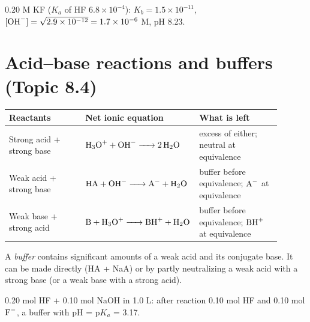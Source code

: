 \documentclass[11pt]{article}
\begin{document}
 0.20 M KF ($K_a$ of HF $6.8\times10^{-4}$): $K_b = 1.5\times10^{-11}$, $[\ce{OH-}] = \sqrt{2.9\times10^{-12}} = 1.7\times10^{-6}$ M, pH 8.23.

\section{Acid--base reactions and buffers (Topic 8.4)}\label{t:8.4}
\begin{center}
\begin{tabular}{p{0.28\linewidth}p{0.32\linewidth}p{0.3\linewidth}}\toprule
Reactants & Net ionic equation & What is left \\ \midrule
Strong acid + strong base & $\ce{H3O+ + OH- -> 2H2O}$ & excess of either; neutral at equivalence \\
Weak acid + strong base & $\ce{HA + OH- -> A- + H2O}$ & buffer before equivalence; $\ce{A-}$ at equivalence \\
Weak base + strong acid & $\ce{B + H3O+ -> BH+ + H2O}$ & buffer before equivalence; $\ce{BH+}$ at equivalence \\ \bottomrule
\end{tabular}
\end{center}
A \emph{buffer} contains significant amounts of a weak acid and its conjugate base. It can be made directly (HA + NaA) or by partly neutralizing a weak acid with a strong base (or a weak base with a strong acid).

 0.20 mol HF + 0.10 mol NaOH in 1.0 L: after reaction 0.10 mol HF and 0.10 mol $\ce{F-}$, a buffer with pH = p$K_a$ = 3.17.
\end{document}

